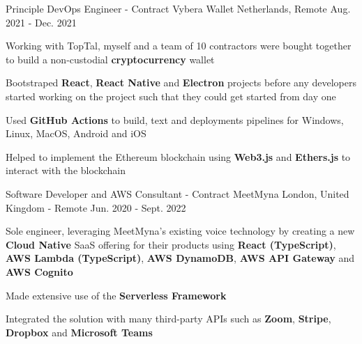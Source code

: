 \begin{cventries}
  \cventry
    {Principle DevOps Engineer - Contract} %
    {Vybera Wallet} %
    {Netherlands, Remote} %
    {Aug. 2021 - Dec. 2021} %
    {
      \begin{cvitems} %
        \item {Working with TopTal, myself and a team of 10 contractors were bought together to build a non-custodial \textbf{cryptocurrency} wallet}
        \item {Bootstraped \textbf{React}, \textbf{React Native} and \textbf{Electron} projects before any developers started working on the project such that they could get started from day one}
        \item {Used \textbf{GitHub Actions} to build, text and deployments pipelines for Windows, Linux, MacOS, Android and iOS}
        \item {Helped to implement the Ethereum blockchain using \textbf{Web3.js} and \textbf{Ethers.js} to interact with the blockchain}
      \end{cvitems}
    }

  \cventry
    {Software Developer and AWS Consultant - Contract} %
    {MeetMyna} %
    {London, United Kingdom - Remote} %
    {Jun. 2020 - Sept. 2022} %
    {
      \begin{cvitems} %
        \item {Sole engineer, leveraging MeetMyna's existing voice technology by creating a new \textbf{Cloud Native} SaaS offering for their products using \textbf{React (TypeScript)}, \textbf{AWS Lambda (TypeScript)}, \textbf{AWS DynamoDB}, \textbf{AWS API Gateway} and \textbf{AWS Cognito}}
        \item {Made extensive use of the \textbf{Serverless Framework}}
        \item {Integrated the solution with many third-party APIs such as \textbf{Zoom}, \textbf{Stripe}, \textbf{Dropbox} and \textbf{Microsoft Teams}}
      \end{cvitems}
    }


\end{cventries}
